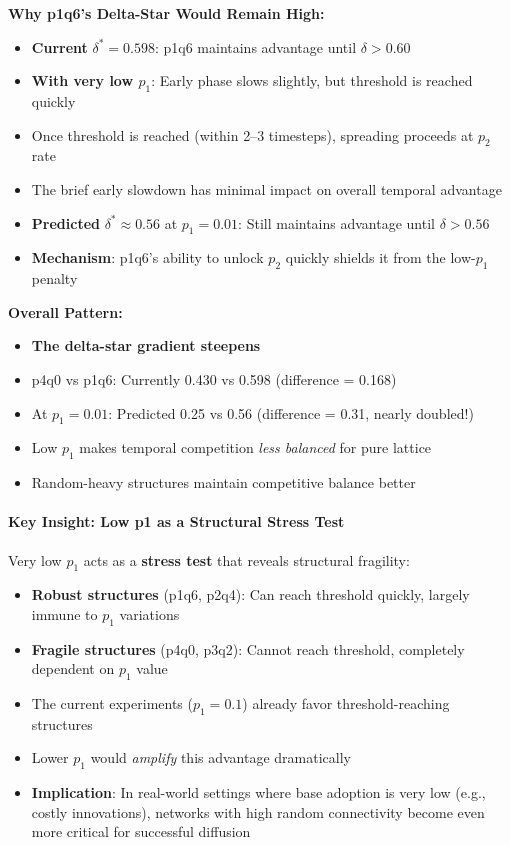 \documentclass[12pt,a4paper]{article}
\begin{document}
\textbf{Why p1q6's Delta-Star Would Remain High:}
\begin{itemize}
    \item \textbf{Current} $\delta^* = 0.598$: p1q6 maintains advantage until $\delta > 0.60$
    \item \textbf{With very low $p_1$}: Early phase slows slightly, but threshold is reached quickly
    \item Once threshold is reached (within 2--3 timesteps), spreading proceeds at $p_2$ rate
    \item The brief early slowdown has minimal impact on overall temporal advantage
    \item \textbf{Predicted} $\delta^* \approx 0.56$ at $p_1=0.01$: Still maintains advantage until $\delta > 0.56$
    \item \textbf{Mechanism}: p1q6's ability to unlock $p_2$ quickly shields it from the low-$p_1$ penalty
\end{itemize}

\textbf{Overall Pattern:}
\begin{itemize}
    \item \textbf{The delta-star gradient steepens}
    \item p4q0 vs p1q6: Currently 0.430 vs 0.598 (difference = 0.168)
    \item At $p_1=0.01$: Predicted 0.25 vs 0.56 (difference = 0.31, nearly doubled!)
    \item Low $p_1$ makes temporal competition \textit{less balanced} for pure lattice
    \item Random-heavy structures maintain competitive balance better
\end{itemize}

\paragraph{Key Insight: Low p1 as a Structural Stress Test}

Very low $p_1$ acts as a \textbf{stress test} that reveals structural fragility:
\begin{itemize}
    \item \textbf{Robust structures} (p1q6, p2q4): Can reach threshold quickly, largely immune to $p_1$ variations
    \item \textbf{Fragile structures} (p4q0, p3q2): Cannot reach threshold, completely dependent on $p_1$ value
    \item The current experiments ($p_1=0.1$) already favor threshold-reaching structures
    \item Lower $p_1$ would \textit{amplify} this advantage dramatically
    \item \textbf{Implication}: In real-world settings where base adoption is very low (e.g., costly innovations), networks with high random connectivity become even more critical for successful diffusion
\end{itemize}
\end{document}

